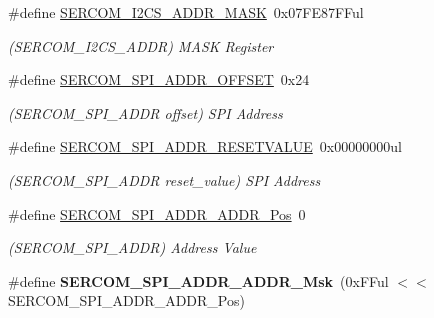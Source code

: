 \begin{DoxyCompactItemize}
\item 
\hypertarget{group___s_a_m_l21___s_e_r_c_o_m_ga64529ca6a340dfbe0750609d455c72be}{}\#define \hyperlink{group___s_a_m_l21___s_e_r_c_o_m_ga64529ca6a340dfbe0750609d455c72be}{S\+E\+R\+C\+O\+M\+\_\+\+I2\+C\+S\+\_\+\+A\+D\+D\+R\+\_\+\+M\+A\+S\+K}~0x07\+F\+E87\+F\+Ful\label{group___s_a_m_l21___s_e_r_c_o_m_ga64529ca6a340dfbe0750609d455c72be}

\begin{DoxyCompactList}\small\item\em (S\+E\+R\+C\+O\+M\+\_\+\+I2\+C\+S\+\_\+\+A\+D\+D\+R) M\+A\+S\+K Register \end{DoxyCompactList}\item 
\hypertarget{group___s_a_m_l21___s_e_r_c_o_m_ga29d57037538f28c61eda89d88408418a}{}\#define \hyperlink{group___s_a_m_l21___s_e_r_c_o_m_ga29d57037538f28c61eda89d88408418a}{S\+E\+R\+C\+O\+M\+\_\+\+S\+P\+I\+\_\+\+A\+D\+D\+R\+\_\+\+O\+F\+F\+S\+E\+T}~0x24\label{group___s_a_m_l21___s_e_r_c_o_m_ga29d57037538f28c61eda89d88408418a}

\begin{DoxyCompactList}\small\item\em (S\+E\+R\+C\+O\+M\+\_\+\+S\+P\+I\+\_\+\+A\+D\+D\+R offset) S\+P\+I Address \end{DoxyCompactList}\item 
\hypertarget{group___s_a_m_l21___s_e_r_c_o_m_gabd68285f221c7ec348c0a8bc49148677}{}\#define \hyperlink{group___s_a_m_l21___s_e_r_c_o_m_gabd68285f221c7ec348c0a8bc49148677}{S\+E\+R\+C\+O\+M\+\_\+\+S\+P\+I\+\_\+\+A\+D\+D\+R\+\_\+\+R\+E\+S\+E\+T\+V\+A\+L\+U\+E}~0x00000000ul\label{group___s_a_m_l21___s_e_r_c_o_m_gabd68285f221c7ec348c0a8bc49148677}

\begin{DoxyCompactList}\small\item\em (S\+E\+R\+C\+O\+M\+\_\+\+S\+P\+I\+\_\+\+A\+D\+D\+R reset\+\_\+value) S\+P\+I Address \end{DoxyCompactList}\item 
\hypertarget{group___s_a_m_l21___s_e_r_c_o_m_ga97f1119d4ede94d57a763a3118a8bbd0}{}\#define \hyperlink{group___s_a_m_l21___s_e_r_c_o_m_ga97f1119d4ede94d57a763a3118a8bbd0}{S\+E\+R\+C\+O\+M\+\_\+\+S\+P\+I\+\_\+\+A\+D\+D\+R\+\_\+\+A\+D\+D\+R\+\_\+\+Pos}~0\label{group___s_a_m_l21___s_e_r_c_o_m_ga97f1119d4ede94d57a763a3118a8bbd0}

\begin{DoxyCompactList}\small\item\em (S\+E\+R\+C\+O\+M\+\_\+\+S\+P\+I\+\_\+\+A\+D\+D\+R) Address Value \end{DoxyCompactList}\item 
\hypertarget{group___s_a_m_l21___s_e_r_c_o_m_ga9e0243eaf75a6e0142b1223e669dd7a4}{}\#define {\bfseries S\+E\+R\+C\+O\+M\+\_\+\+S\+P\+I\+\_\+\+A\+D\+D\+R\+\_\+\+A\+D\+D\+R\+\_\+\+Msk}~(0x\+F\+Ful $<$$<$ S\+E\+R\+C\+O\+M\+\_\+\+S\+P\+I\+\_\+\+A\+D\+D\+R\+\_\+\+A\+D\+D\+R\+\_\+\+Pos)\label{group___s_a_m_l21___s_e_r_c_o_m_ga9e0243eaf75a6e0142b1223e669dd7a4}


\end{DoxyCompactItemize}
